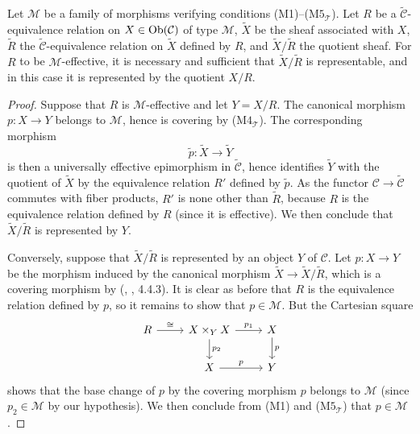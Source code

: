 \begin{proposition}\label{site sheaf M-effective relation iff quotient representable}
Let $\mathcal{M}$ be a family of morphisms verifying conditions (M1)--($\text{M5}_\mathcal{T}$). Let $R$ be a $\widetilde{\mathcal{C}}$-equivalence relation on $X\in\mathrm{Ob}(\mathcal{C})$ of type $\mathcal{M}$, $\widetilde{X}$ be the sheaf associated with $X$, $\widetilde{R}$ the $\widetilde{\mathcal{C}}$-equivalence relation on $\widetilde{X}$ defined by $R$, and $\widetilde{X}/\widetilde{R}$ the quotient sheaf. For $R$ to be $\mathcal{M}$-effective, it is necessary and sufficient that $\widetilde{X}/\widetilde{R}$ is representable, and in this case it is represented by the quotient $X/R$.
\end{proposition}
\begin{proof}
Suppose that $R$ is $\mathcal{M}$-effective and let $Y=X/R$. The canonical morphism $p:X\to Y$ belongs to $\mathcal{M}$, hence is covering by ($\text{M4}_\mathcal{T}$). The corresponding morphism
\[\tilde{p}:\widetilde{X}\to\widetilde{Y}\]
is then a universally effective epimorphism in $\widetilde{\mathcal{C}}$, hence identifies $\widetilde{Y}$ with the quotient of $\widetilde{X}$ by the equivalence relation $R'$ defined by $\tilde{p}$. As the functor $\mathcal{C}\to\widetilde{\mathcal{C}}$ commutes with fiber products, $R'$ is none other than $\widetilde{R}$, because $R$ is the equivalence relation defined by $R$ (since it is effective). We then conclude that $\widetilde{X}/\widetilde{R}$ is represented by $Y$.\par
Conversely, suppose that $\widetilde{X}/\widetilde{R}$ is represented by an object $Y$ of $\mathcal{C}$. Let $p:X\to Y$ be the morphism induced by the canonical morphism $\widetilde{X}\to\widetilde{X}/\widetilde{R}$, which is a covering morphism by (\cite{SGA3-1}, , 4.4.3). It is clear as before that $R$ is the equivalence relation defined by $p$, so it remains to show that $p\in\mathcal{M}$. But the Cartesian square
\[\begin{tikzcd}
R\ar[r,"\cong"]&X\times_YX\ar[d,"p_2"]\ar[r,"p_1"]&X\ar[d,"p"]\\
&X\ar[r,"p"]&Y
\end{tikzcd}\]
shows that the base change of $p$ by the covering morphism $p$ belongs to $\mathcal{M}$ (since $p_2\in\mathcal{M}$ by our hypothesis). We then conclude from (M1) and ($\text{M5}_\mathcal{T}$) that $p\in\mathcal{M}$.
\end{proof}

